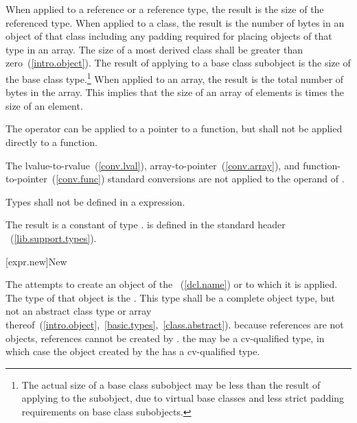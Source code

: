 \pnum
{}%
When applied to a reference or a reference type, the result is the size
of the referenced type.
%
When applied to a class, the result is the number of bytes in an object
of that class including any padding required for placing objects of that
type in an array. The size of a most derived class shall be greater than
zero~(\ref{intro.object}). The result of applying  to a
base class subobject is the size of the base class type.\footnote{The actual
size of a base class subobject may be less than the result of
applying  to the subobject, due to virtual base classes
and less strict padding requirements on base class subobjects.}
%
When applied to an array, the result is the total number of bytes in the
array. This implies that the size of an array of  elements is
 times the size of an element.

\pnum
The  operator can be applied to a pointer to a function,
but shall not be applied directly to a function.

\pnum
The lvalue-to-rvalue~(\ref{conv.lval}),
array-to-pointer~(\ref{conv.array}), and
function-to-pointer~(\ref{conv.func}) standard conversions are not
applied to the operand of .

\pnum
Types shall not be defined in a  expression.

\pnum
The result is a constant of type .
\enternote 
{}%
%
 is defined in the standard header
%
~(\ref{lib.support.types}).
\exitnote 

[expr.new]{New}

\pnum
{}%
%
%
%
%
The  attempts to create an object of the
~(\ref{dcl.name}) or  to which
it is applied. The type of that object is the .
%
This type shall be a complete object type, but not an abstract class
type or array
thereof~(\ref{intro.object},~\ref{basic.types},~\ref{class.abstract}).
\enternote 
because references are not objects, references cannot be created by
.
\exitnote 
\enternote 
the  may be a cv-qualified type, in which case the
object created by the  has a cv-qualified type.
\exitnote 

